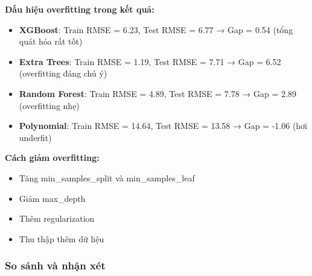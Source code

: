 \documentclass[12pt,a4paper]{article}
\begin{document}
\textbf{Dấu hiệu overfitting trong kết quả:}
\begin{itemize}
    \item \textbf{XGBoost}: Train RMSE = 6.23, Test RMSE = 6.77 → Gap = 0.54 (tổng quát hóa rất tốt)
    \item \textbf{Extra Trees}: Train RMSE = 1.19, Test RMSE = 7.71 → Gap = 6.52 (overfitting đáng chú ý)
    \item \textbf{Random Forest}: Train RMSE = 4.89, Test RMSE = 7.78 → Gap = 2.89 (overfitting nhẹ)
    \item \textbf{Polynomial}: Train RMSE = 14.64, Test RMSE = 13.58 → Gap = -1.06 (hơi underfit)
\end{itemize}

\textbf{Cách giảm overfitting:}
\begin{itemize}
    \item Tăng min\_samples\_split và min\_samples\_leaf
    \item Giảm max\_depth
    \item Thêm regularization
    \item Thu thập thêm dữ liệu
\end{itemize}

\subsubsection{So sánh và nhận xét}
\end{document}
